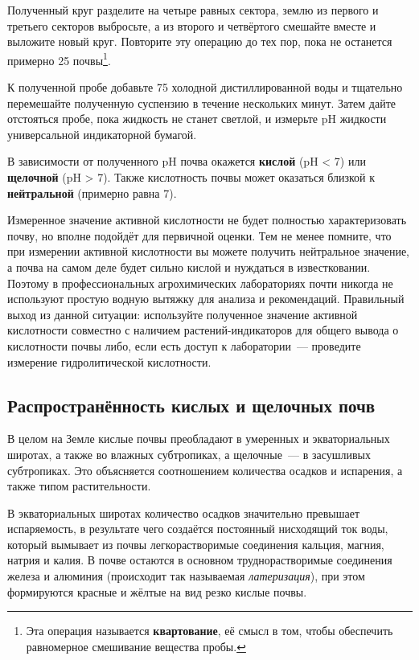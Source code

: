 Полученный круг разделите на четыре равных сектора, землю из первого и третьего секторов выбросьте, а из второго и четвёртого смешайте вместе и выложите новый круг. Повторите эту операцию до тех пор, пока не останется примерно \qty{25}{\ruG} почвы\footnote{Эта операция называется \textbf{квартование}, её смысл в том, чтобы обеспечить равномерное смешивание вещества пробы.}.

К полученной пробе добавьте \qty{75}{\ruG} холодной дистиллированной воды и тщательно перемешайте полученную суспензию в течение нескольких минут. Затем дайте отстояться пробе, пока жидкость не станет светлой, и измерьте pH жидкости универсальной индикаторной бумагой.

В зависимости от полученного pH почва окажется \textbf{кислой} (pH < 7) или \textbf{щелочной} (pH > 7). Также кислотность почвы может оказаться близкой к \textbf{нейтральной} (примерно равна 7).

Измеренное значение активной кислотности не будет полностью характеризовать почву, но вполне подойдёт для первичной оценки. Тем не менее помните, что при измерении активной кислотности вы можете получить нейтральное значение, а почва на самом деле будет сильно кислой и нуждаться в известковании. Поэтому в профессиональных агрохимических лабораториях почти никогда не используют простую водную вытяжку для анализа и рекомендаций. Правильный выход из данной ситуации: используйте полученное значение активной кислотности совместно с наличием растений-индикаторов для общего вывода о кислотности почвы либо, если есть доступ к лаборатории~--- проведите измерение гидролитической кислотности.

\subsection*{Распространённость кислых и щелочных почв}

В целом на Земле кислые почвы преобладают в умеренных и экваториальных широтах, а также во влажных субтропиках, а щелочные~--- в засушливых субтропиках. Это объясняется соотношением количества осадков и испарения, а также типом растительности.

В экваториальных широтах количество осадков значительно превышает испаряемость, в результате чего создаётся постоянный нисходящий ток воды, который вымывает из почвы легкорастворимые соединения кальция, магния, натрия и калия. В почве остаются в основном труднорастворимые соединения железа и алюминия (происходит так называемая \emph{латеризация}), при этом формируются красные и жёлтые на вид резко кислые почвы.

